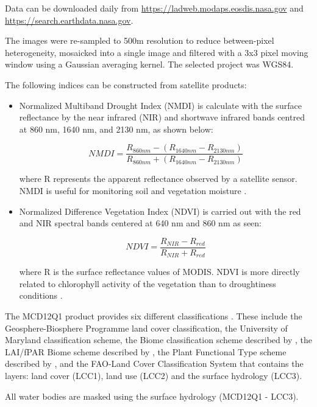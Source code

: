 \documentclass{article}
\begin{document}
Data can be downloaded daily from \url{https://ladweb.modaps.eosdis.nasa.gov} and \url{https://search.earthdata.nasa.gov}.

The images were re-sampled to 500m resolution to reduce between-pixel heterogeneity, mosaicked into a single image and filtered with a 3x3 pixel moving window using a Gaussian averaging kernel. The selected project was WGS84.

The following indices can be constructed from satellite products: 

\begin{itemize}
    \item Normalized Multiband Drought Index (NMDI) is calculate with the surface reflectance by the near infrared (NIR) and shortwave infrared bands centred at 860 nm, 1640 nm, and 2130 nm, as shown below: 
    
    $$ NMDI = \frac{R_{860nm} - (R_{1640nm}-R_{2130nm})}{R_{860nm} + (R_{1640nm}-R_{2130nm})} $$
    
    where R represents the apparent reflectance observed by a satellite sensor. NMDI is useful for monitoring soil and vegetation moisture \cite{wang2008forest}.

    \item Normalized Difference Vegetation Index (NDVI) is carried out with the red and NIR spectral bands centered at 640 nm and 860 nm as seen:
    
    $$ NDVI = \frac{R_{NIR} - R_{red}}{R_{NIR} + R_{red}} $$
    
    where R is the surface reflectance values of MODIS. NDVI is more directly related to chlorophyll activity of the vegetation than to droughtiness conditions \cite{leblon2001monitoring}.
    
\end{itemize}

The MCD12Q1 product provides six different classifications \cite{friedl2015mcd12q1}. These include the Geosphere-Biosphere Programme land cover classification, the University of Maryland classification scheme, the Biome classification scheme described by \cite{running2004continuous}, the LAI/fPAR Biome scheme described by \cite{myneni2002global}, the Plant Functional Type scheme described by \cite{bonan2002landscapes}, and the FAO-Land Cover Classification System that contains the layers: land cover (LCC1), land use (LCC2) and the surface hydrology (LCC3).

All water bodies are masked using the surface hydrology (MCD12Q1 - LCC3).
\end{document}
